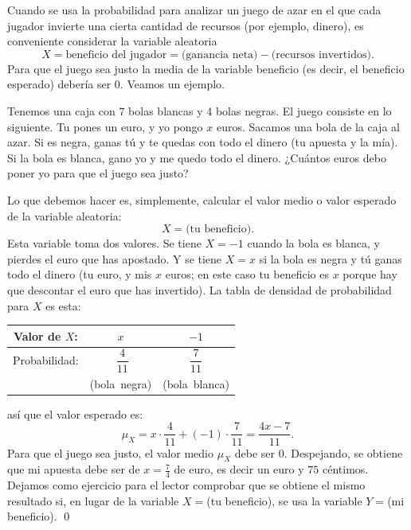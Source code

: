 Cuando se usa la probabilidad para analizar un juego de azar en el que cada jugador invierte una cierta cantidad de recursos (por ejemplo, dinero), es conveniente considerar la variable aleatoria
    \[X=\mbox{beneficio del jugador}=\mbox{(ganancia neta)}-\mbox{(recursos invertidos)}.\]
Para que el juego sea justo la media de la variable beneficio (es decir, el beneficio esperado) debería ser $0$. Veamos un ejemplo.
\begin{ejemplo}\label{cap04:ejem:JuegosJustos}
Tenemos una caja con $7$ bolas blancas y 4 bolas negras. El juego consiste en lo siguiente. Tu pones un euro, y yo pongo $x$ euros. Sacamos una bola de la caja al azar. Si es negra, ganas tú y te quedas con todo el dinero (tu apuesta y la mía). Si la bola es blanca, gano yo y me quedo todo el dinero. ¿Cuántos euros debo poner yo para que el juego sea justo?

Lo que debemos hacer es, simplemente, calcular el valor medio o valor esperado de la variable aleatoria:
\[X=\mbox{(tu beneficio)}.\]
Esta variable toma dos valores. Se tiene $X=-1$ cuando la bola es blanca, y pierdes el euro que has apostado. Y se tiene $X=x$ si la bola es negra y tú ganas todo el dinero (tu euro, y mis $x$ euros; en este caso tu beneficio es $x$ porque hay que descontar el euro que has invertido). La tabla de densidad de probabilidad para $X$ es esta:
\begin{center}
    \begin{tabular}[t]{|c|c|c|}
    \hline
    Valor de $X$:\rule{0cm}{0.5cm}
    &$x$&$-1$\\
    \hline
    Probabilidad:\rule{0cm}{0.7cm}
    &$\,\,\dfrac{4}{11}$&$\dfrac{7}{11}$\\[2mm]
    &\mbox{(bola negra)}&\mbox{(bola blanca)}\\
    \hline
    \end{tabular}
\end{center}
así que el valor esperado es:
\[\mu_X=x\cdot\dfrac{4}{11}+(-1)\cdot\dfrac{7}{11}=\dfrac{4x-7}{11}.\]
Para que el juego sea justo, el valor medio $\mu_X$ debe ser $0$. Despejando, se obtiene que mi apuesta debe ser de $x=\frac{7}{4}$ de euro, es decir un euro y $75$ céntimos.  Dejamos como ejercicio para el lector comprobar que se obtiene el mismo resultado si, en lugar de la variable $X=$(tu beneficio), se usa la variable $Y=$(mi beneficio).
\qed
\end{ejemplo}
%
%
%
%
%
